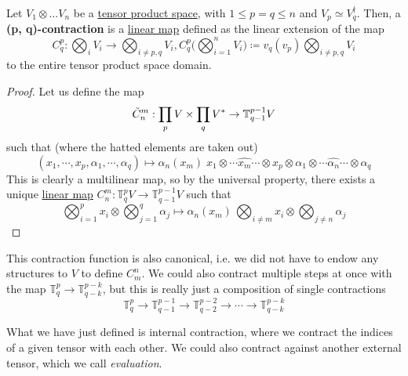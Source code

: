	\begin{definition}[Contraction]
	  \label{def:contraction}
		Let $V_1 \otimes \ldots V_n$ be a \hyperref[def:tensor]{tensor product space}, with $1 \leq p = q \leq n$ and $V_p \simeq V_q^\dagger$. Then, a \textbf{(p, q)-contraction} is a \hyperref[def:linear_map]{linear map} defined as the linear extension of the map 
		\begin{equation}
			C^p_q : \bigotimes_{i} V_i \to \bigotimes_{i \neq p, q} V_i, C^p_q \bigg( \bigotimes_{i=1}^n V_i \bigg) \coloneqq v_q(v_p) \bigotimes_{i \neq p, q} V_i
		\end{equation}
		to the entire tensor product space domain. 
  \end{definition}
	\begin{proof}
		Let us define the map 
		\begin{equation}
    	\Tilde{C}^m_n: \prod_{p} V \times \prod_q V^* \to \mathbb{T}^{p-1}_{q-1} V
		\end{equation}
    such that (where the hatted elements are taken out)
		\begin{equation}
    	(x_1, \cdots, x_p, \alpha_1, \cdots, \alpha_q) \mapsto \alpha_n (x_m) \; x_1 \otimes \cdots \hat{x_m} \cdots \otimes x_p \otimes \alpha_1 \otimes \cdots \hat{\alpha_n} \cdots \otimes \alpha_q
		\end{equation}
    This is clearly a multilinear map, so by the universal property, there exists a unique \hyperref[def:linear_map]{linear map} $C^m_n: \mathbb{T}^p_q V \to \mathbb{T}^{p-1}_{q-1} V$ such that 
		\begin{equation}
    	\bigotimes_{i=1}^p x_i \otimes \bigotimes_{j=1}^q \alpha_j \mapsto \alpha_n (x_m) \, \bigotimes_{i \neq m} x_i \otimes \bigotimes_{j \neq n} \alpha_j
		\end{equation}
	\end{proof}

	This contraction function is also canonical, i.e. we did not have to endow any structures to $V$ to define $C^n_m$. We could also contract multiple steps at once with the map $\mathbb{T}^p_q \to \mathbb{T}^{p-k}_{q-k}$, but this is really just a composition of single contractions 
	\begin{equation}
  	\mathbb{T}^p_q \to \mathbb{T}^{p-1}_{q-1} \to \mathbb{T}^{p-2}_{q-2} \to \cdots \to \mathbb{T}^{p-k}_{q-k}
	\end{equation}

	What we have just defined is internal contraction, where we contract the indices of a given tensor with each other. We could also contract against another external tensor, which we call \textit{evaluation}. 

